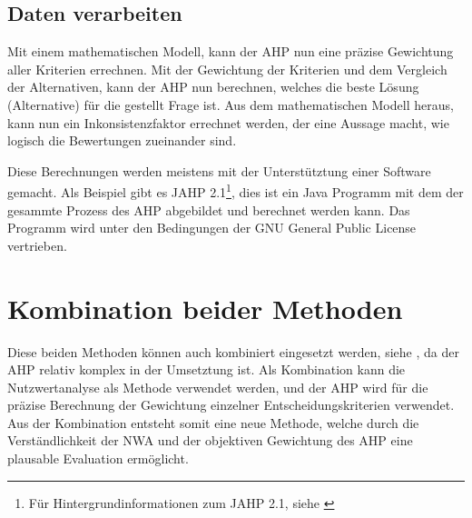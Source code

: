   \subsection{Daten verarbeiten}
  
  Mit einem mathematischen Modell, kann der \ac{AHP} nun eine präzise Gewichtung
  aller Kriterien errechnen. Mit der Gewichtung der Kriterien und dem Vergleich
  der Alternativen, kann der \ac{AHP} nun berechnen, welches die beste Lösung
  (Alternative) für die gestellt Frage ist. Aus dem mathematischen Modell
  heraus, kann nun ein Inkonsistenzfaktor errechnet werden, der eine Aussage
  macht, wie logisch die Bewertungen zueinander sind.
  
  Diese Berechnungen werden meistens mit der Unterstütztung einer Software
  gemacht. Als Beispiel gibt es JAHP 2.1\footnote{Für Hintergrundinformationen
  zum JAHP 2.1, siehe \cite{JAHP}}, dies ist ein Java Programm mit dem der
  gesammte Prozess des \ac{AHP} abgebildet und berechnet werden kann. Das
  Programm wird unter den Bedingungen der GNU General Public License
  vertrieben.
    
  \section{Kombination beider Methoden}
  
  Diese beiden Methoden können auch kombiniert eingesetzt werden, siehe
  \cite{AhpNwaKombination}, da der \ac{AHP} relativ komplex in der Umsetztung
  ist. Als Kombination kann die Nutzwertanalyse als Methode verwendet werden,
  und der \ac{AHP} wird für die präzise Berechnung der Gewichtung einzelner
  Entscheidungskriterien verwendet. Aus der Kombination entsteht somit eine
  neue Methode, welche durch die Verständlichkeit der \ac{NWA} und der
  objektiven Gewichtung des \ac{AHP} eine plausable Evaluation ermöglicht.


